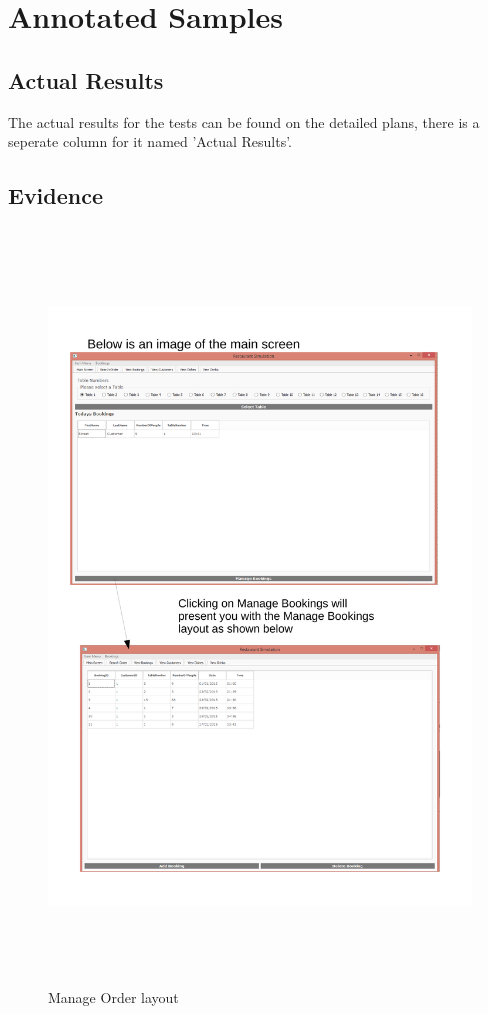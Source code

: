 \section{Annotated Samples}

\subsection{Actual Results}
The actual results for the tests can be found on the detailed plans, there is a seperate column for it named 'Actual Results'.

\subsection{Evidence}

\begin{figure}[H]
    \includegraphics[height = 20cm]{./Testing/images/test1}
    \caption{Manage Order layout} \label{fig:Test1}
\end{figure}

